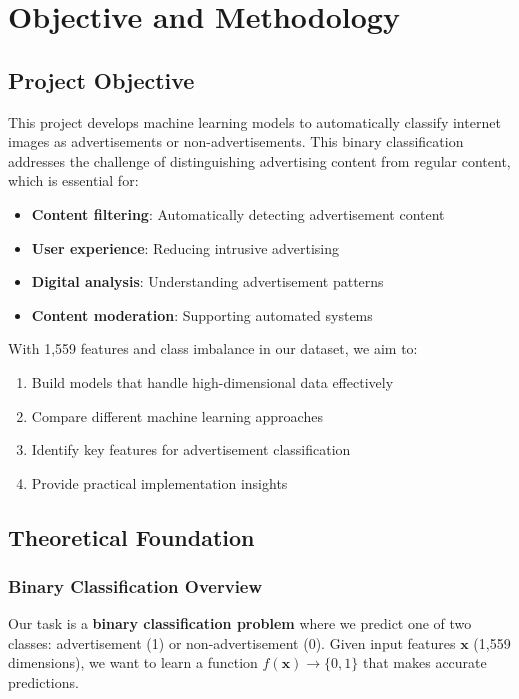 \section{Objective and Methodology}
\label{sec:objective-methodology}

\subsection{Project Objective}
This project develops machine learning models to automatically classify internet images as advertisements or non-advertisements. This binary classification addresses the challenge of distinguishing advertising content from regular content, which is essential for:

\begin{itemize}
    \item \textbf{Content filtering}: Automatically detecting advertisement content
    \item \textbf{User experience}: Reducing intrusive advertising
    \item \textbf{Digital analysis}: Understanding advertisement patterns
    \item \textbf{Content moderation}: Supporting automated systems
\end{itemize}

With 1,559 features and class imbalance in our dataset, we aim to:
\begin{enumerate}
    \item Build models that handle high-dimensional data effectively
    \item Compare different machine learning approaches
    \item Identify key features for advertisement classification
    \item Provide practical implementation insights
\end{enumerate}

\subsection{Theoretical Foundation}
\subsubsection{Binary Classification Overview}
Our task is a \textbf{binary classification problem} where we predict one of two classes: advertisement (1) or non-advertisement (0). Given input features $\mathbf{x}$ (1,559 dimensions), we want to learn a function $f(\mathbf{x}) \rightarrow \{0,1\}$ that makes accurate predictions.

